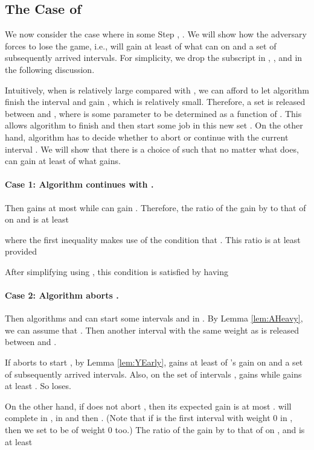 \documentclass[11pt]{article}
\begin{document}
\subsection{The Case of } 
  \label{subsec:ylarge}

We now consider the case where in some Step ,
.
We will show how the adversary forces  to lose the game,
i.e.,  will gain at least  of what  can
on  and a set of subsequently arrived intervals.
For simplicity, we drop the subscript  in , , and
 in the following discussion.

Intuitively, when  is relatively large compared with ,
we can afford to let algorithm  finish the interval 
and gain , which is relatively small.
Therefore, a set  is released 
between  and ,
where  is some parameter to be determined
as a function of .
This allows algorithm  to finish  and then start
some job in this new set .
On the other hand, algorithm  has to decide whether to
abort or continue with the current interval .
We will show that there is a choice of  such that no matter
what  does,  can gain at least  of what 
gains.

\paragraph{Case 1: Algorithm  continues with .}

Then  gains at most 
while  can gain .
Therefore, the ratio of the gain by  to that of 
on  and  is at least

where the first inequality makes use of the condition that
.
This ratio is at least  provided

After simplifying using ,
this condition is satisfied by having


\paragraph{Case 2: Algorithm  aborts .}

Then algorithms  and  can start some intervals
 and  in .
By Lemma \ref{lem:AHeavy},
we can assume that .
Then another interval  with the same weight as  
is released between  and .

If  aborts  to start ,
by Lemma \ref{lem:YEarly},  gains at least
 of 's gain on  and a set of subsequently
arrived intervals.
Also, on the set of intervals ,
 gains  while  gains at least 
 .
So  loses.

On the other hand, if  does not abort ,
then its expected gain is at most 
.
 will complete  in ,
 in  and then .
(Note that if  is the first interval with weight 0
in , then we set  to be of weight 0 too.)
The ratio of the gain by  to that of  
on ,  and  is at least
\end{document}
